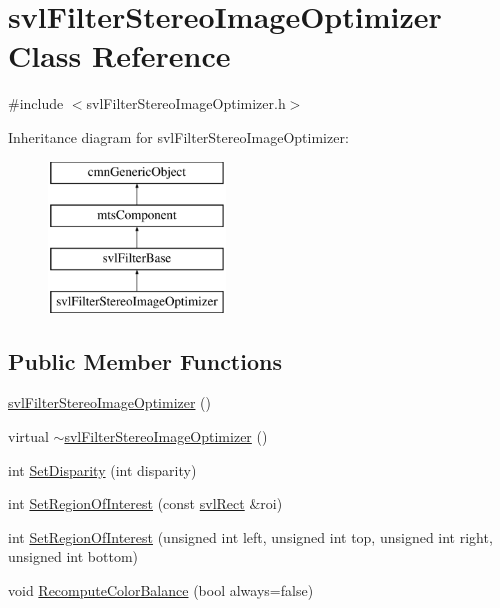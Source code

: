 \hypertarget{classsvl_filter_stereo_image_optimizer}{\section{svl\-Filter\-Stereo\-Image\-Optimizer Class Reference}
\label{classsvl_filter_stereo_image_optimizer}
}


{\ttfamily \#include $<$svl\-Filter\-Stereo\-Image\-Optimizer.\-h$>$}

Inheritance diagram for svl\-Filter\-Stereo\-Image\-Optimizer\-:\begin{figure}[H]
\begin{center}
\leavevmode
\includegraphics[height=4.000000cm]{d6/d9d/classsvl_filter_stereo_image_optimizer}
\end{center}
\end{figure}
\subsection*{Public Member Functions}
\begin{DoxyCompactItemize}
\item 
\hyperlink{classsvl_filter_stereo_image_optimizer_a260d8b3099640f3a6f122348a5e22f51}{svl\-Filter\-Stereo\-Image\-Optimizer} ()
\item 
virtual \hyperlink{classsvl_filter_stereo_image_optimizer_a64c9ab2ed17454c5d97ec866d0fd0e1a}{$\sim$svl\-Filter\-Stereo\-Image\-Optimizer} ()
\item 
int \hyperlink{classsvl_filter_stereo_image_optimizer_a894d73594bef3b793f2c009ad061f137}{Set\-Disparity} (int disparity)
\item 
int \hyperlink{classsvl_filter_stereo_image_optimizer_acbf21f003860de77abbbdecf5bf96be5}{Set\-Region\-Of\-Interest} (const \hyperlink{structsvl_rect}{svl\-Rect} \&roi)
\item 
int \hyperlink{classsvl_filter_stereo_image_optimizer_acb681399e8cad49db480daa06f81dd14}{Set\-Region\-Of\-Interest} (unsigned int left, unsigned int top, unsigned int right, unsigned int bottom)
\item 
void \hyperlink{classsvl_filter_stereo_image_optimizer_ad303db544f6e95fbbdd64639cadc0762}{Recompute\-Color\-Balance} (bool always=false)
\end{DoxyCompactItemize}
